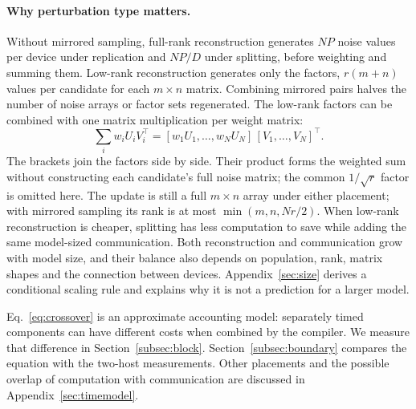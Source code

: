 \paragraph{Why perturbation type matters.} Without mirrored sampling, full-rank
reconstruction generates $NP$ noise values per device under replication and $NP/D$ under
splitting, before weighting and summing them. Low-rank reconstruction generates only the
factors, $r(m+n)$ values per candidate for each $m\times n$ matrix. Combining mirrored
pairs halves the number of noise arrays or factor sets regenerated. The low-rank factors
can be combined with one matrix multiplication per weight matrix:
\[
  \textstyle\sum_i w_i U_iV_i^\top
  =[w_1U_1,\dots,w_NU_N]\,[V_1,\dots,V_N]^\top .
\]
The brackets join the factors side by side. Their product forms the weighted sum
without constructing each candidate's full noise matrix; the common $1/\sqrt r$ factor
is omitted here. The update is still a full $m\times n$ array under either placement;
with mirrored sampling its rank is at most $\min(m,n,Nr/2)$. When low-rank reconstruction
is cheaper, splitting has less computation to save while adding the same model-sized
communication. Both reconstruction and communication grow with model size, and their
balance also depends on
population, rank, matrix shapes and the connection between devices.
Appendix~\ref{sec:size} derives a conditional scaling rule and explains why it is not a
prediction for a larger model.

Eq.~\ref{eq:crossover} is an approximate accounting model: separately timed components
can have different costs when combined by the compiler. We measure that difference in
Section~\ref{subsec:block}. Section~\ref{subsec:boundary} compares the equation with 
the two-host measurements. Other placements and the possible overlap of computation with 
communication are discussed in Appendix~\ref{sec:timemodel}.
